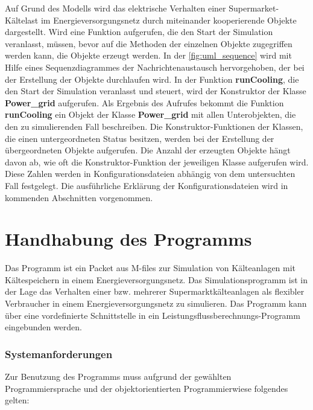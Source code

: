 Auf Grund des Modells wird das elektrische Verhalten einer
Supermarket-K\"altelast im Energieversorgungsnetz durch miteinander
kooperierende Objekte dargestellt. Wird eine Funktion aufgerufen, die den Start
der Simulation veranlasst, m\"ussen, bevor auf die Methoden der einzelnen
Objekte zugegriffen werden kann, die Objekte erzeugt werden. In der
\cref{fig:uml_sequence} wird mit Hilfe eines Sequenzdiagrammes der
Nachrichtenaustausch hervorgehoben, der bei der Erstellung der Objekte
durchlaufen wird. In der Funktion \textbf{runCooling}, die den Start der
Simulation veranlasst und steuert, wird der Konstruktor der Klasse
\textbf{Power\_grid} aufgerufen. Als Ergebnis des Aufrufes bekommt die Funktion
\textbf{runCooling} ein Objekt der Klasse \textbf{Power\_grid} mit allen
Unterobjekten, die den zu simulierenden Fall beschreiben. Die
Konstruktor-Funktionen der Klassen, die einen untergeordneten Status besitzen,
werden bei der Erstellung der \"ubergeordneten Objekte aufgerufen. Die Anzahl
der erzeugten Objekte h\"angt davon ab, wie oft die Konstruktor-Funktion der
jeweiligen Klasse aufgerufen wird. Diese Zahlen werden in Konfigurationsdateien
abh\"angig von dem untersuchten Fall festgelegt. Die ausf\"uhrliche Erkl\"arung
der Konfigurationsdateien wird in kommenden Abschnitten vorgenommen.

\section{Handhabung des Programms}
\label{sc:handhabung}

Das Programm ist ein Packet aus \matlab M-files zur Simulation von Kälteanlagen
mit Kältespeichern in einem Energieversorgungsnetz. Das Simulationsprogramm ist
in der Lage das Verhalten einer bzw. mehrerer Supermarktkälteanlagen als
flexibler Verbraucher in einem Energieversorgungsnetz zu simulieren. Das
Programm kann über eine vordefinierte Schnittstelle in ein
Leistungsflussberechnungs-Programm eingebunden werden.

\subsubsection{Systemanforderungen}

Zur Benutzung des Programms muss aufgrund der gewählten Programmiersprache und
der objektorientierten Programmierwiese folgendes gelten:

